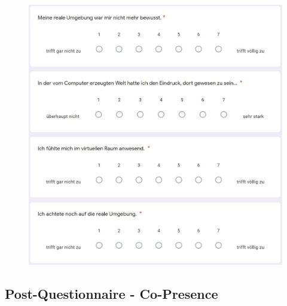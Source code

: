 \documentclass[a4paper,11pt]{article}%
\renewcommand{\\}{\vspace*{0.5\baselineskip} \newline}
\begin{document}
	\begin{figure}[H]
	\centering
		\begin{footnotesize}
			\includegraphics[scale=0.6]{Abbildungen/Fragebogen/Post-Questionnaire/PQP3}
		\end{footnotesize}
	\end{figure}	

\newpage
\subsection{Post-Questionnaire - Co-Presence}			
\label{Post-Questionnaire - Co-Presence}		
\end{document}
